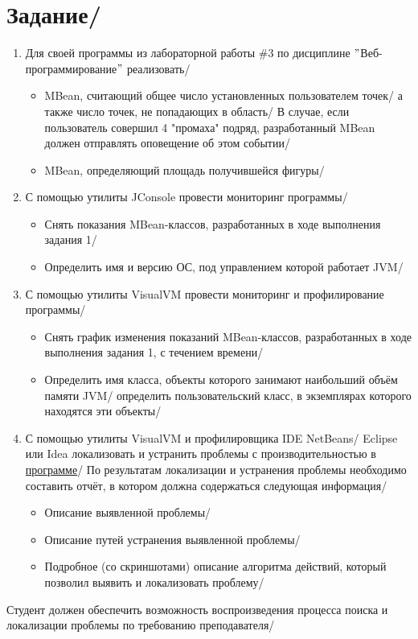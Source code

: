 \section{Задание/}
\begin{enumerate}
    \item Для своей программы из лабораторной работы \#3 по дисциплине \("\)Веб-программирование\("\) реализовать/
    \begin{itemize}
        \item MBean, считающий общее число установленных пользователем точек/ а также число точек, не попадающих в область/ В случае, если пользователь
        совершил 4 "промаха" подряд, разработанный MBean должен отправлять оповещение об этом событии/
        \item MBean, определяющий площадь получившейся фигуры/
    \end{itemize}
    \item С помощью утилиты JConsole провести мониторинг программы/
    \begin{itemize}
        \item Снять показания MBean-классов, разработанных в ходе выполнения задания 1/
        \item Определить имя и версию ОС, под управлением которой работает JVM/
    \end{itemize}
    \item С помощью утилиты VisualVM провести мониторинг и профилирование программы/
    \begin{itemize}
        \item Снять график изменения показаний MBean-классов, разработанных в ходе выполнения задания 1, с течением времени/
        \item Определить имя класса, объекты которого занимают наибольший объём памяти JVM/ определить пользовательский класс, в экземплярах которого
        находятся эти объекты/
    \end{itemize}
    \item С помощью утилиты VisualVM и профилировщика IDE NetBeans/ Eclipse или Idea локализовать и устранить проблемы с производительностью в
    \href{https://se.ifmo.ru/documents/10180/189115/HttpUnit.tar.gz/7bf1032e-d16e-be85-c71b-dbe73c0178ba?t=1651168887037&download=true}{программе}/
    По результатам локализации и устранения проблемы необходимо составить отчёт, в котором должна содержаться следующая информация/
    \begin{itemize}
        \item Описание выявленной проблемы/
        \item Описание путей устранения выявленной проблемы/
        \item Подробное (со скриншотами) описание алгоритма действий, который позволил выявить и локализовать проблему/
    \end{itemize}
\end{enumerate}
Студент должен обеспечить возможность воспроизведения процесса поиска и локализации проблемы по требованию преподавателя/

